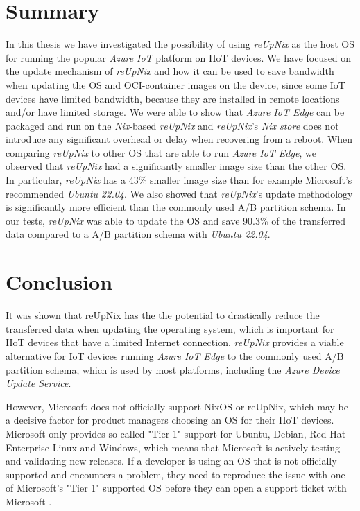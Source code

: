 \section{Summary}
In this thesis we have investigated the possibility of using \textit{reUpNix} as the
host \ac{OS} for running the popular \textit{Azure IoT} platform on \ac{IIoT} devices.
We have focused on the update mechanism of \textit{reUpNix} and how it can be used
to save bandwidth when updating the \ac{OS} and \ac{OCI}-container images on the device,
since some \ac{IoT} devices have limited bandwidth, because they are installed in
remote locations and/or have limited storage. We were able to show that \textit{Azure IoT Edge}
can be packaged and run on the \textit{Nix}-based \textit{reUpNix} and
\textit{reUpNix}'s \textit{Nix store} does not introduce any significant overhead
or delay when recovering from a reboot. When comparing \textit{reUpNix} to
other \ac{OS} that are able to run \textit{Azure IoT Edge}, we observed that \textit{reUpNix}
had a significantly smaller image size than the other \ac{OS}. In particular,
\textit{reUpNix} has a 43\% smaller image size than for example Microsoft's
recommended \textit{Ubuntu 22.04}. We also showed that \textit{reUpNix}'s update
methodology is significantly more efficient than the commonly used A/B partition
schema. In our tests, \textit{reUpNix} was able to update the \ac{OS} and save
90.3\% of the transferred data compared to a A/B partition schema with \textit{Ubuntu 22.04}.


\section{Conclusion}
It was shown that reUpNix has the the potential to drastically reduce the transferred
data when updating the operating system, which is important for \ac{IIoT} devices
that have a limited Internet connection. \textit{reUpNix} provides a viable
alternative for \ac{IoT} devices running \textit{Azure IoT Edge}
to the commonly used A/B partition schema, which is used by most platforms,
including the \textit{Azure Device Update Service}.

However, Microsoft does not officially support NixOS or reUpNix, which may be a decisive factor
for product managers choosing an \ac{OS} for their \ac{IIoT} devices. Microsoft
only provides so called "Tier 1" support for Ubuntu, Debian, Red Hat Enterprise
Linux and Windows, which means that Microsoft is actively testing and validating
new releases. If a developer is using an \ac{OS} that is not officially supported
and encounters a problem, they need to reproduce the issue with one of Microsoft's
"Tier 1" supported \ac{OS} before they can open a support ticket with Microsoft
\cite{msdoc-supportetplatforms}.

